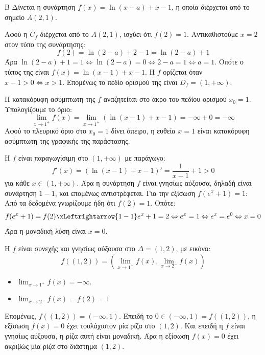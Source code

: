 \begin{thema}{Β}
Δίνεται η συνάρτηση $f(x) = \ln(x-a) + x - 1$, η οποία διέρχεται από το σημείο $A(2, 1)$.

\begin{erwthma}
\item Αφού η $C_f$ διέρχεται από το $A(2, 1)$, ισχύει ότι $f(2) = 1$.
Αντικαθιστούμε $x = 2$ στον τύπο της συνάρτησης:
\[ f(2) = \ln(2-a) + 2 - 1 = \ln(2-a) + 1 \]
Άρα $\ln(2-a) + 1 = 1 \Leftrightarrow \ln(2-a) = 0 \Leftrightarrow 2-a = 1 \Leftrightarrow a = 1$.
Οπότε ο τύπος της είναι $f(x) = \ln(x-1) + x - 1$.
Η $f$ ορίζεται όταν $x-1 > 0 \Leftrightarrow x > 1$.
Επομένως το πεδίο ορισμού της είναι $D_f = (1, +\infty)$.

\item Η κατακόρυφη ασύμπτωτη της $f$ αναζητείται στο άκρο του πεδίου ορισμού $x_0 = 1$.
Υπολογίζουμε το όριο:
\[ \lim_{x\to1^+} f(x) = \lim_{x\to1^+} (\ln(x-1) + x - 1) =-\infty + 0 = -\infty\]
Αφού το πλευρικό όριο στο $x_0 = 1$ δίνει άπειρο, η ευθεία $x = 1$ είναι κατακόρυφη ασύμπτωτη της γραφικής της παράστασης.

\item Η $f$ είναι παραγωγίσιμη στο $(1, +\infty)$ με παράγωγο:
\[ f'(x) = (\ln(x-1) + x - 1)' = \dfrac{1}{x-1} + 1>0 \]
για κάθε $x \in (1, +\infty)$. Άρα η συνάρτηση $f$ είναι γνησίως αύξουσα, δηλαδή είναι συνάρτηση $1-1$, και επομένως αντιστρέφεται. Για την εξίσωση $f(e^x+1) = 1$:
Από τα δεδομένα γνωρίζουμε ήδη ότι $f(2) = 1$. Οπότε:
\[ f(e^x+1) = f(2)\xLeftrightarrow{1-1}e^x+1 = 2 \Leftrightarrow e^x = 1 \Leftrightarrow e^x = e^0 \Leftrightarrow x = 0 \]
Άρα η μοναδική λύση είναι $x = 0$.

\item Η $f$ είναι συνεχής και γνησίως αύξουσα στο $\Delta = (1, 2)$, με εικόνα:
\[ f((1, 2)) = \left( \lim_{x\to1^+} f(x), \lim_{x\to2^-} f(x) \right) \]
\begin{itemize}
\item $\displaystyle\lim_{x\to1^+} f(x)=-\infty$.
\item $\displaystyle\lim_{x\to2^-} f(x) = f(2) = 1$
\end{itemize}
Επομένως, $f((1, 2))=(-\infty, 1)$. Επειδή το $0\in(-\infty, 1) = f((1, 2))$, η εξίσωση $f(x) = 0$ έχει τουλάχιστον μία ρίζα στο $(1, 2)$. Και επειδή η $f$ είναι γνησίως αύξουσα, η ρίζα αυτή είναι μοναδική. Άρα η εξίσωση $f(x) = 0$ έχει ακριβώς μία ρίζα στο διάστημα $(1, 2)$.
\end{erwthma}
\end{thema}

